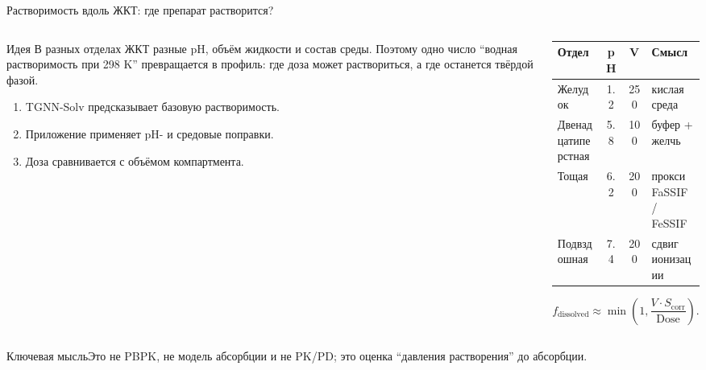 \documentclass[aspectratio=169,10pt]{beamer}
\newcommand{\keybox}[1]{\begin{block}{Ключевая мысль}#1\end{block}}
\newcommand{\tightitems}{\setlength{\itemsep}{0.25em}}
\begin{document}
\begin{frame}{Растворимость вдоль ЖКТ: где препарат растворится?}
  \small
  \begin{columns}[T,onlytextwidth]
    \begin{column}{0.50\textwidth}
      \begin{block}{Идея}
        \scriptsize
        В разных отделах ЖКТ разные pH, объём жидкости и состав среды. Поэтому одно число ``водная растворимость при 298 K'' превращается в профиль: где доза может раствориться, а где останется твёрдой фазой.
      \end{block}
      \begin{enumerate}\tightitems
        \item TGNN-Solv предсказывает базовую растворимость.
        \item Приложение применяет pH- и средовые поправки.
        \item Доза сравнивается с объёмом компартмента.
      \end{enumerate}
    \end{column}
    \begin{column}{0.46\textwidth}
      \begin{tabularx}{\textwidth}{lccY}
        \toprule
        \textbf{Отдел} & pH & V & \textbf{Смысл}\\
        \midrule
        Желудок & 1.2 & 250 & кислая среда\\
        Двенадцатиперстная & 5.8 & 100 & буфер + желчь\\
        Тощая & 6.2 & 200 & прокси FaSSIF / FeSSIF\\
        Подвздошная & 7.4 & 200 & сдвиг ионизации\\
        \bottomrule
      \end{tabularx}
      \[
        f_{\mathrm{dissolved}}\approx
        \min\!\left(1,\frac{V\cdot S_{\mathrm{corr}}}{\mathrm{Dose}}\right).
      \]
    \end{column}
  \end{columns}
  \keybox{Это не PBPK, не модель абсорбции и не PK/PD; это оценка ``давления растворения'' до абсорбции.}
\end{frame}
\end{document}
